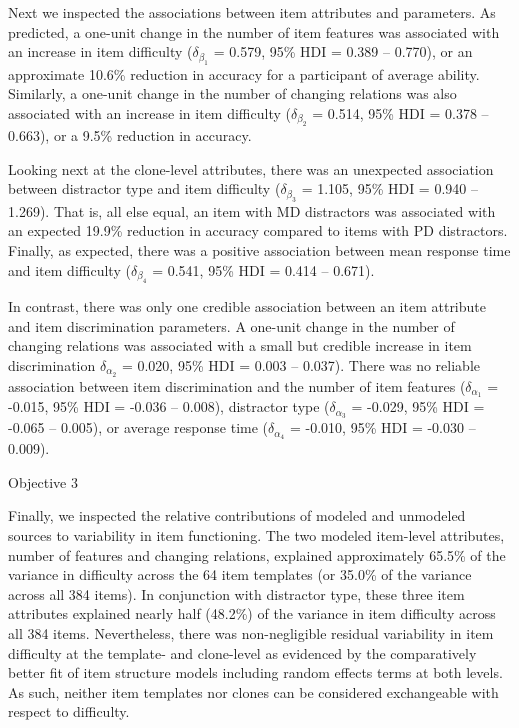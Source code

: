 \documentclass[a4paper,man,natbib]{apa6}
\makeatletter
\renewcommand{\subsubsection}{\@startsection{subsubsection}{3}
  {\z@}%
  {\b@level@two@skip}{\e@level@two@skip}%
  {\normalfont\normalsize\bfseries}}
\makeatother
\begin{document}
Next we inspected the associations between item attributes and parameters. As predicted, a one-unit change in the number of item features was associated with an increase in item difficulty ($\delta_{\beta_1}$ = 0.579, 95\% HDI = 0.389 -- 0.770), or an approximate 10.6\% reduction in accuracy for a participant of average ability. Similarly, a one-unit change in the number of changing relations was also associated with an increase in item difficulty ($\delta_{\beta_2}$ = 0.514, 95\% HDI = 0.378 -- 0.663), or a 9.5\% reduction in accuracy. 

Looking next at the clone-level attributes, there was an unexpected association between distractor type and item difficulty ($\delta_{\beta_3}$ = 1.105, 95\% HDI = 0.940 -- 1.269). That is, all else equal, an item with MD distractors was associated with an expected 19.9\% reduction in accuracy compared to items with PD distractors. Finally, as expected, there was a positive association between mean response time and item difficulty ($\delta_{\beta_4}$ = 0.541, 95\% HDI = 0.414 -- 0.671). 

In contrast, there was only one credible association between an item attribute and item discrimination parameters. A one-unit change in the number of changing relations was associated with a small but credible increase in item discrimination  $\delta_{\alpha_2}$ = 0.020, 95\% HDI = 0.003 -- 0.037). There was no reliable association between item discrimination and the number of item features ($\delta_{\alpha_1}$ = -0.015, 95\% HDI = -0.036 -- 0.008), distractor type  ($\delta_{\alpha_3}$ = -0.029, 95\% HDI = -0.065 -- 0.005), or average response time ($\delta_{\alpha_4}$ = -0.010, 95\% HDI = -0.030 -- 0.009).

\subsubsection{Objective 3}

Finally, we inspected the relative contributions of modeled and unmodeled sources to variability in item functioning. The two modeled item-level attributes, number of features and changing relations, explained approximately 65.5\% of the variance in difficulty across the 64 item templates (or 35.0\% of the variance across all 384 items). In conjunction with distractor type, these three item attributes explained nearly half (48.2\%) of the variance in item difficulty across all 384 items. Nevertheless, there was non-negligible residual variability in item difficulty at the template- and clone-level as evidenced by the comparatively better fit of item structure models including random effects terms at both levels. As such, neither item templates nor clones can be considered exchangeable with respect to difficulty.
\end{document}
